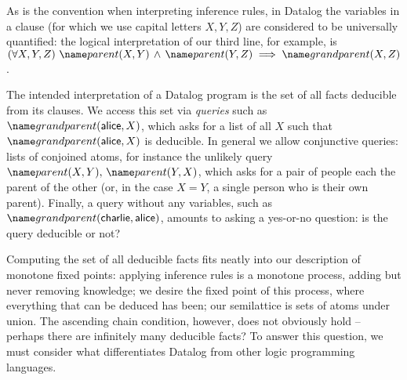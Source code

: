As is the convention when interpreting inference rules, in Datalog the variables
in a clause (for which we use capital letters $X,Y,Z$) are considered to be
universally quantified: the logical interpretation of our third line, for
example, is $\fa{X, Y, Z} \atom{parent}{X, Y} \wedge \atom{parent}{Y, Z}
\implies \atom{grandparent}{X, Z}$.

The intended interpretation of a Datalog program is the set of all
facts deducible from its clauses.
%
We access this set via \emph{queries} such as
$\atom{grandparent}{\datum{alice},X}$, which asks for a list of all $X$ such
that $\atom{grandparent}{\datum{alice},X}$ is deducible. In general we allow
conjunctive queries: lists of conjoined atoms, for instance the unlikely query
$\atom{parent}{X,Y} \conj \atom{parent}{Y,X}$, which asks for a pair of people
each the parent of the other (or, in the case $X = Y$, a single person who is
their own parent). Finally, a query without any variables, such as
$\atom{grandparent}{\datum{charlie}, \datum{alice}}$, amounts to asking a
yes-or-no question: is the query deducible or not?


Computing the set of all deducible facts fits neatly into our description of
monotone fixed points: applying inference rules is a monotone process, adding
but never removing knowledge; we desire the fixed point of this process, where
everything that can be deduced has been; our semilattice is sets of atoms under
union. The ascending chain condition, however, does not obviously hold --
perhaps there are infinitely many deducible facts? To answer this question, we
must consider what differentiates Datalog from other logic programming
languages.






